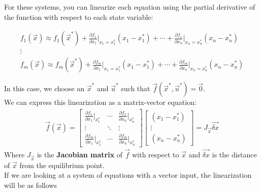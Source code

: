 For these systems, you can linearize each equation using the partial derivative of the function with respect to each state variable:
\begin{center}
    \begin{align*}
        f_1(\vec{x}) \approx f_1(\vec{x}^*) + \frac{\partial f_1}{\partial x_1} \bigg\rvert_{x_1 = x_1^*} (x_1 - x_1^*) + \cdots + \frac{\partial f_1}{\partial x_n} \bigg\rvert_{x_n = x_n^*} (x_n - x_n^*) \\
        \vdots \\
        f_m(\vec{x}) \approx f_m(\vec{x}^*) + \frac{\partial f_m}{\partial x_1} \bigg\rvert_{x_1 = x_1^*} (x_1 - x_1^*) + \cdots + \frac{\partial f_m}{\partial x_n} \bigg\rvert_{x_n = x_n^*} (x_n - x_n^*)
    \end{align*}
\end{center}
In this case, we choose an $\vec{x}^*$ and $\vec{u}^*$ such that $\vec{f}(\vec{x}^*, \vec{u}^*) = \vec{0}$. \\
\newline
We can express this linearization as a matrix-vector equation:
\begin{align*}
    \vec{f}(\vec{x}) = \begin{bmatrix}
        \frac{\partial f_1}{\partial x_1} \bigg\rvert_{x_1^*} & \cdots & \frac{\partial f_1}{\partial x_n} \bigg\rvert_{x_n^*} \\
        \vdots & \ddots & \vdots \\
        \frac{\partial f_m}{\partial x_1} \bigg\rvert_{x_1^*} & \cdots & \frac{\partial f_m}{\partial x_n} \bigg\rvert_{x_n^*}
    \end{bmatrix} \begin{bmatrix}
        (x_1 - x_1^*) \\
        \vdots \\
        (x_n - x_n^*)
    \end{bmatrix} = \boxed{J_{\vec{x}} \vec{\delta x}}
\end{align*}
Where $J_{\vec{x}}$ is the \textbf{Jacobian matrix} of $\vec{f}$ with respect to $\vec{x}$ and $\vec{\delta x}$ is the distance of $\vec{x}$ from the equilibrium point. \\
\newline
If we are looking at a system of equations with a vector input, the linearization will be as follows
